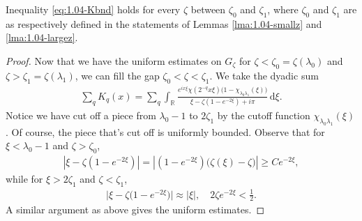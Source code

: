 \documentclass[../dissertation.tex]{subfiles}
\begin{document}
\begin{lma}%
	\label{lma:1.04-medz}
	Inequality \eqref{eq:1.04-Kbnd} holds for every $\zeta$ between 
	$\zeta_0$ and $\zeta_1$, where $\zeta_0$ and $\zeta_1$ are as respectively
	defined in the statements of Lemmas \ref{lma:1.04-smallz} and \ref{lma:1.04-largez}.
\end{lma}
\begin{proof}
	Now that we have the uniform estimates on $G_\zeta$ for 
	$\zeta < \zeta_0 = \zeta(\lambda_0)$ and $\zeta > \zeta_1 = \zeta(\lambda_1)$, 
	we can fill the gap $\zeta_0 < \zeta < \zeta_1$. We take the dyadic sum
	\begin{align}
		\sum_q K_q(x) 
			= \sum_q 
				\int_{\mathbb R} 
					\frac{
						e^{ix\xi}\chi\left(2^{-q}x\xi\right)
						\big(1-\chi_{\lambda_0 \lambda_1}(\xi)\big)
					}
					{\xi - \zeta\left(1-e^{-2\xi}\right) + i \pi}
				\, \mathrm{d}\xi.
	\end{align}
	Notice we have cut of{}f a piece from $\lambda_0-1$ to $2\zeta_1$ by the 
	cutof{}f function 
	$\chi_{\lambda_0\lambda_1}(\xi)$. Of course, the piece that's cut of{}f is uniformly 
	bounded. Observe that for $\xi<\lambda_0-1$ and $\zeta>\zeta_0$, 
	\begin{align*}
		\left|\xi-\zeta\left(1-e^{-2\xi}\right)\right|
			= \left|\left(1-e^{-2\xi}\right)\big(\zeta(\xi)-\zeta\big)\right|
			\ge Ce^{-2\xi},
	\end{align*}
	while for $\xi>2\zeta_1$ and $\zeta<\zeta_1$,
	\begin{align*}
		\big|\xi-\zeta\big(1-e^{-2\xi}\big)\big| 
			\approx |\xi|, \quad 2\zeta e^{-2\xi}<\frac12.
	\end{align*}
	A similar argument as above gives the uniform estimates.
\end{proof}
\end{document}

